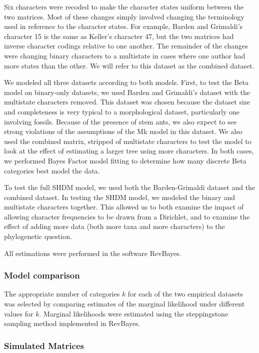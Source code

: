 \documentclass[]{sysbio}
\begin{document}
Six characters were recoded to make the character states uniform between the two matrices.
Most of these changes simply involved changing the terminology used in reference to the character states.
For example, Barden and Grimaldi's character 15 is the same as Keller's character 47, but the two matrices had inverse character codings relative to one another.
The remainder of the changes were changing binary characters to a multistate in cases where one author had more states than the other. 
We will refer to this dataset as the combined dataset. \par
We modeled all three datasets according to both models.
First, to test the Beta model on binary-only datasets, we used Barden and Grimaldi's dataset with the multistate characters removed.
This dataset was chosen because the dataset size and completeness is very typical to a morphological dataset, particularly one involving fossils.
Because of the presence of stem ants, we also expect to see strong violations of the assumptions of the Mk model in this dataset.
We also used the combined matrix, stripped of multistate characters to test the model to look at the effect of estimating a larger tree using more characters.
In both cases, we performed Bayes Factor model fitting to determine how many discrete Beta categories best model the data. \par
To test the full SHDM model, we used both the Barden-Grimaldi dataset and the combined dataset.
In testing the SHDM model, we modeled the binary and multistate characters together.
This allowed us to both examine the impact of allowing character frequencies to be drawn from a Dirichlet, and to examine the effect of adding more data (both more taxa and more characters) to the phylogenetic question. 
\par
All estimations were performed in the software RevBayes.
\subsubsection{Model comparison}

The appropriate number of categories $k$ for each of the two empirical datasets was selected by comparing estimates of the marginal likelihood under different values for $k$.
Marginal likelihoods were estimated using the steppingstone sampling method \citep{xie2010improving} implemented in RevBayes.


\subsubsection{Simulated Matrices}
\end{document}
